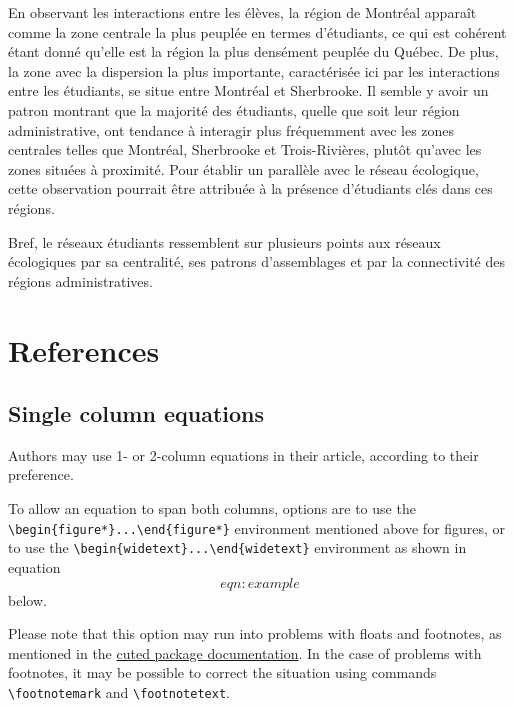 \documentclass[9pt,twocolumn,twoside,]{pnas-new}
\begin{document}
En observant les interactions entre les élèves, la région de Montréal
apparaît comme la zone centrale la plus peuplée en termes d'étudiants,
ce qui est cohérent étant donné qu'elle est la région la plus densément
peuplée du Québec. De plus, la zone avec la dispersion la plus
importante, caractérisée ici par les interactions entre les étudiants,
se situe entre Montréal et Sherbrooke. Il semble y avoir un patron
montrant que la majorité des étudiants, quelle que soit leur région
administrative, ont tendance à interagir plus fréquemment avec les zones
centrales telles que Montréal, Sherbrooke et Trois-Rivières, plutôt
qu'avec les zones situées à proximité. Pour établir un parallèle avec le
réseau écologique, cette observation pourrait être attribuée à la
présence d'étudiants clés dans ces régions.

Bref, le réseaux étudiants ressemblent sur plusieurs points aux réseaux
écologiques par sa centralité, ses patrons d'assemblages et par la
connectivité des régions administratives.

\hypertarget{references}{%
\section*{References}\label{references}}

\hypertarget{single-column-equations}{%
\subsection*{Single column equations}\label{single-column-equations}}

Authors may use 1- or 2-column equations in their article, according to
their preference.

To allow an equation to span both columns, options are to use the
\texttt{\textbackslash{}begin\{figure*\}...\textbackslash{}end\{figure*\}}
environment mentioned above for figures, or to use the
\texttt{\textbackslash{}begin\{widetext\}...\textbackslash{}end\{widetext\}}
environment as shown in equation \[eqn:example\] below.

Please note that this option may run into problems with floats and
footnotes, as mentioned in the \href{http://texdoc.net/pkg/cuted}{cuted
package documentation}. In the case of problems with footnotes, it may
be possible to correct the situation using commands
\texttt{\textbackslash{}footnotemark} and
\texttt{\textbackslash{}footnotetext}.
\end{document}
